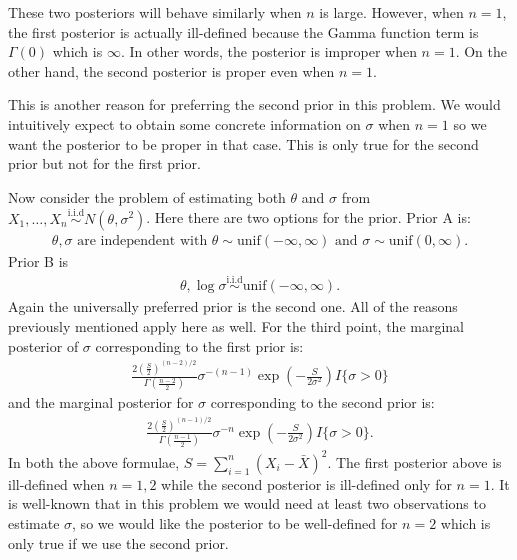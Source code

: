 \documentclass{scrartcl}
\begin{document}
\begin{enumerate}
  These two posteriors will behave similarly when $n$ is
  large. However, when $n = 1$, the first posterior is actually
  ill-defined because the Gamma function term is $\Gamma(0)$ which is
  $\infty$. In other words, the posterior is improper when $n = 1$.
  On the other hand, the second posterior is proper even when $n =
  1$.

  This is another reason for preferring the second prior in this
  problem. We would intuitively expect to obtain some concrete
  information on $\sigma$ when $n = 1$ so we want the posterior to be
  proper in that case. This is only true for the second prior but not
  for the first prior. 
\end{enumerate}

Now consider the problem of estimating both $\theta$ and $\sigma$ from
$X_1, \dots, X_n \overset{\text{i.i.d}}{\sim} N(\theta,
\sigma^2)$. Here there are two options for the prior. Prior A is:
\begin{align*}
  \theta, \sigma \text{ are independent with } \theta \sim
  \text{unif}(-\infty, \infty) \text{ and } \sigma \sim \text{unif}(0, \infty). 
\end{align*}
Prior B is
\begin{align*}
  \theta, \log \sigma \overset{\text{i.i.d}}{\sim} \text{unif}(-\infty,
  \infty). 
\end{align*}
Again the universally preferred prior is the second one. All of the
reasons previously mentioned apply here as well. For the third point, 
the marginal posterior of $\sigma$ corresponding to the first prior
is:
\begin{align}
  \label{post11}
      \frac{2 \left(\frac{S}{2}
    \right)^{(n-2)/2}}{\Gamma\left(\frac{n-2}{2} \right)}
    \sigma^{-(n-1)} \exp \left(-\frac{S}{2 \sigma^2} \right) I\{\sigma > 0\}
\end{align}
and the marginal posterior for $\sigma$ corresponding to the second
prior is:
\begin{align}
  \label{post22}
  \frac{2 \left(\frac{S}{2}
    \right)^{(n-1)/2}}{\Gamma\left(\frac{n-1}{2} \right)}
    \sigma^{-n} \exp \left(-\frac{S}{2 \sigma^2} \right) I\{\sigma >
  0\}. 
\end{align}
In both the above formulae, $S = \sum_{i=1}^n (X_i - \bar{X})^2$. The
first posterior above is ill-defined when $n = 1, 2$  while the second
posterior is ill-defined only for $n = 1$. It is well-known that in
this problem we would need at least two observations to estimate
$\sigma$, so we would like the posterior to be well-defined for $n =
2$ which is only true if we use the second prior. 
\end{document}
